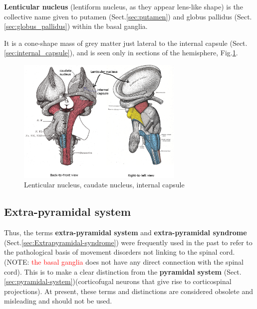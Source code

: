 {\bf Lenticular nucleus} (lentiform nucleus, as they appear lens-like shape) is
the collective name given to putamen (Sect.\ref{sec:putamen}) and globus
pallidus (Sect.\ref{sec:globus_pallidus}) within the basal ganglia.

It is a cone-shape mass of grey matter just lateral to the internal capsule
(Sect.\ref{sec:internal_capsule}), and is seen only in sections of the
hemisphere, Fig.\ref{fig:lenticular_nucleus}.



\begin{figure}[hbt]
  \centerline{\includegraphics[height=6cm,
    angle=0]{./images/lenticular_nucleus.eps}}
\caption{Lenticular nucleus, caudate nucleus, internal capsule}
\label{fig:lenticular_nucleus}
\end{figure}


\subsection{Extra-pyramidal system}
\label{sec:extra-pyramidal-system}


Thus, the terms {\bf extra-pyramidal system} and {\bf extra-pyramidal syndrome}
(Sect.\ref{sec:Extrapyramidal-syndrome}) were frequently used in the past to
refer to the pathological basis of movement disorders not linking to the spinal
cord. (NOTE: \textcolor{red}{the basal ganglia} does not have any direct
connection with the spinal cord). This is to make a clear distinction from the
{\bf pyramidal system} (Sect.\ref{sec:pyramidal-system})(corticofugal neurons
that give rise to corticospinal projections). At present, these terms and
distinctions are considered obsolete and misleading and should not be used.




